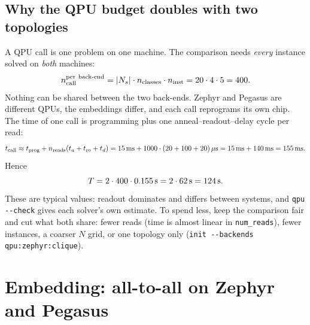 \documentclass[11pt,a4paper]{article}
\newcommand{\code}[1]{\nolinkurl{#1}}
\begin{document}
\subsection{Why the QPU budget doubles with two topologies}
A QPU call is one problem on one machine. The comparison needs \emph{every} instance solved on \emph{both} machines:
\begin{equation}
n_{\rm call}^{\rm per\ back\text{-}end}=|N_s|\cdot n_{\rm classes}\cdot n_{\rm inst}=20\cdot4\cdot5=400 .
\end{equation}
Nothing can be shared between the two back-ends. Zephyr and Pegasus are different QPUs, the embeddings
differ, and each call reprograms its own chip. The time of one call is programming plus one anneal--readout--delay cycle per read:
\begin{equation}
t_{\rm call}\approx t_{\rm prog}+n_{\rm reads}(t_a+t_{\rm ro}+t_d)=15\,{\rm ms}+1000\cdot(20+100+20)\,\mu{\rm s}
=15\,{\rm ms}+140\,{\rm ms}=155\,{\rm ms}.
\end{equation}
Hence
\begin{equation}
T=2\cdot400\cdot0.155\,{\rm s}=2\cdot62\,{\rm s}=124\,{\rm s}.
\end{equation}
These are typical values: readout dominates and differs between systems, and \code{qpu --check} gives each
solver's own estimate. To spend less, keep the comparison fair and cut what both share: fewer reads (time is
almost linear in \code{num_reads}), fewer instances, a coarser $N$ grid, or one topology only
(\code{init --backends qpu:zephyr:clique}).

\section{Embedding: all-to-all on Zephyr and Pegasus}
\end{document}
